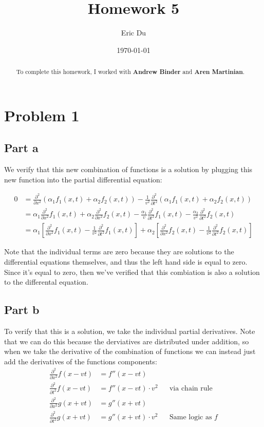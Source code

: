 \documentclass{article}
\title{Homework 5}
\author{Eric Du}
\date{\today}
\theoremstyle{definition}
\numberwithin{equation}{section}
\numberwithin{definition}{section}
\begin{document}
\maketitle
\begin{abstract}
\noindent To complete this homework, I worked with \textbf{Andrew Binder} and \textbf{Aren Martinian}.
\end{abstract}
\section{Problem 1}


\subsection*{Part a}

We verify that this new combination of functions is a solution by plugging this new function into the partial differential equation:

\begin{align*}
    0 &= \frac{\partial^2}{\partial x^2} (\alpha_1 f_1(x,t) + \alpha_2 f_2(x, t)) - \frac{1}{v^2} \frac{\partial^2}{\partial t^2}(\alpha_1f_1(x, t) + \alpha_2f_2(x, t))\\
    &= \alpha_1\frac{\partial^2}{\partial x^2} f_1(x, t) + \alpha_2\frac{\partial^2}{\partial x^2}f_2(x, t) - \frac{\alpha_1}{v} \frac{\partial^2}{\partial t^2}f_1(x, t) - \frac{\alpha_2}{v^2} \frac{\partial^2}{\partial t^2} f_2(x, t)\\
    &= \alpha_1\left[\frac{\partial^2}{\partial x^2} f_1(x, t) - \frac{1}{v^2}\frac{\partial^2}{\partial t^2} f_1(x, t)\right] + \alpha_2\left[\frac{\partial^2}{\partial x^2}f_2(x, t) - \frac{1}{v^2}\frac{\partial^2}{\partial t^2} f_2(x, t)\right]
\end{align*}

Note that the individual terms are zero because they are solutions to the differential equations themselves, and thus the left hand side is equal to zero. Since it's equal to zero, then we've verified that this combiation is also a solution to the differental equation.

\subsection*{Part b}

To verify that this is a solution, we take the individual partial derivatives. Note that we can do this because the derviatives are distributed under addition, so when we take the derivative of the combination of functions we can instead just add the derivatives of the functions components:
\begin{align*}
    \frac{\partial^2}{\partial x^2} f(x - vt) &= f''(x - vt)\\
    \frac{\partial^2}{\partial t^2} f(x - vt) &= f''(x - vt) \cdot v^2 && \text{via chain rule}\\
    \frac{\partial^2}{\partial x^2} g(x + vt) &= g''(x + vt)\\
    \frac{\partial^2}{\partial t^2} g(x + vt) &= g''(x + vt) \cdot v^2 && \text{Same logic as $f$}
\end{align*}
\end{document}
